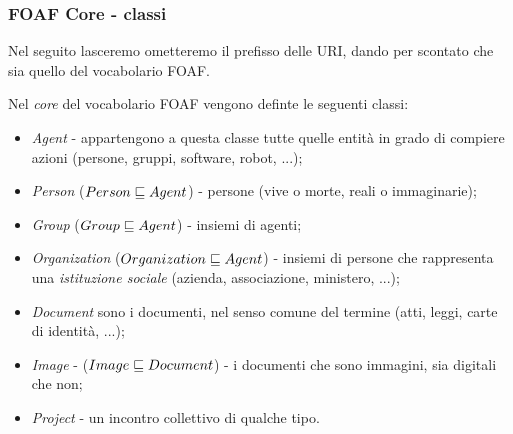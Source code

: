 \documentclass[8pt]{beamer}
\begin{document}
\begin{frame}
  \frametitle{FOAF Core - classi}
  Nel seguito lasceremo ometteremo il prefisso delle URI, dando per scontato che sia 
  quello del vocabolario FOAF.
  \vspace{\baselineskip}
  
  Nel \emph{core} del vocabolario FOAF vengono definte le seguenti classi:
  
  \begin{itemize}
   \item \emph{Agent} - appartengono a questa classe tutte quelle entit\`a in grado di compiere azioni
   (persone, gruppi, software, robot, ...);   
   \item \emph{Person} ($Person \sqsubseteq Agent$) - persone (vive o morte, reali o immaginarie);
   \item \emph{Group} ($Group \sqsubseteq Agent$) - insiemi di agenti;
   \item \emph{Organization} ($Organization \sqsubseteq Agent$) - insiemi di persone che rappresenta una \emph{istituzione sociale} (azienda, associazione, ministero, ...);
   \item \emph{Document} sono i documenti, nel senso comune del termine (atti, leggi, carte di identit\`a, ...);
   \item \emph{Image} - ($Image \sqsubseteq Document$) - i documenti che sono immagini, sia digitali che non;
   \item \emph{Project} - un incontro collettivo di qualche tipo.
  \end{itemize}
\end{frame}
\end{document}
